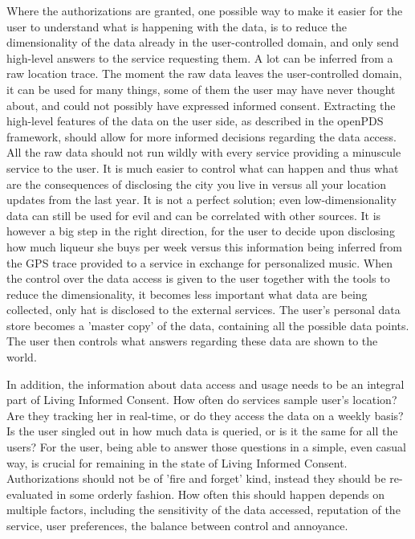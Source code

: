Where the authorizations are granted, one possible way to make it easier for the user to understand what is happening with the data, is to reduce the dimensionality of the data already in the user-controlled domain, and only send high-level answers to the service requesting them.
A lot can be inferred from a raw location trace.
The moment the raw data leaves the user-controlled domain, it can be used for many things, some of them the user may have never thought about, and could not possibly have expressed informed consent.
Extracting the high-level features of the data on the user side, as described in the openPDS framework, should allow for more informed decisions regarding the data access.
All the raw data should not run wildly with every service providing a minuscule service to the user.
It is much easier to control what can happen and thus what are the consequences of disclosing the city you live in versus all your location updates from the last year.
It is not a perfect solution; even low-dimensionality data can still be used for evil and can be correlated with other sources.
It is however a big step in the right direction, for the user to decide upon disclosing how much liqueur she buys per week versus this information being inferred from the GPS trace provided to a service in exchange for personalized music.
When the control over the data access is given to the user together with the tools to reduce the dimensionality, it becomes less important what data are being collected, only hat is disclosed to the external services.
The user's personal data store becomes a 'master copy' of the data, containing all the possible data points.
The user then controls what answers regarding these data are shown to the world.

In addition, the information about data access and usage needs to be an integral part of Living Informed Consent.
How often do services sample user's location?
Are they tracking her in real-time, or do they access the data on a weekly basis? 
Is the user singled out in how much data is queried, or is it the same for all the users?
For the user, being able to answer those questions in a simple, even casual way, is crucial for remaining in the state of Living Informed Consent.
Authorizations should not be of 'fire and forget' kind, instead they should be re-evaluated in some orderly fashion.
How often this should happen depends on multiple factors, including the sensitivity of the data accessed, reputation of the service, user preferences, the balance between control and annoyance. 

